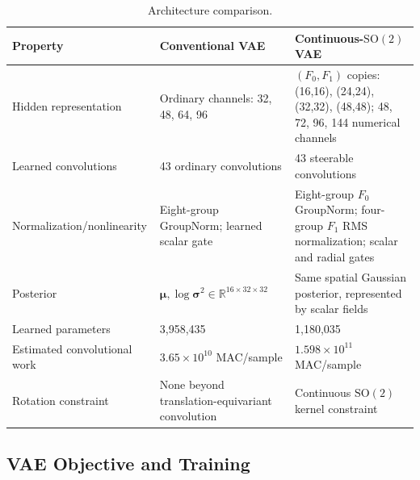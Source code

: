 \documentclass[conference,a4paper]{IEEEtran}
\newcommand{\SOtwo}{\mathrm{SO}(2)}
\begin{document}
\begin{table}[t]
\caption{Architecture comparison.}
\label{tab:architectures}
\centering
\footnotesize
\begin{tabular}{p{}p{}p{}}
\toprule
Property & Conventional VAE & Continuous-$\SOtwo$ VAE \\
\midrule
Hidden representation & Ordinary channels: 32, 48, 64, 96 & $(F_0,F_1)$ copies: (16,16), (24,24), (32,32), (48,48); 48, 72, 96, 144 numerical channels \\
Learned convolutions & 43 ordinary convolutions & 43 steerable convolutions \\
Normalization/nonlinearity & Eight-group GroupNorm; learned scalar gate & Eight-group $F_0$ GroupNorm; four-group $F_1$ RMS normalization; scalar and radial gates \\
Posterior & $\boldsymbol{\mu},\log\boldsymbol{\sigma}^{2}\in\mathbb{R}^{16\times32\times32}$ & Same spatial Gaussian posterior, represented by scalar fields \\
Learned parameters & 3,958,435 & 1,180,035 \\
Estimated convolutional work & $3.65\times10^{10}$ MAC/sample & $1.598\times10^{11}$ MAC/sample \\
Rotation constraint & None beyond translation-equivariant convolution & Continuous $\SOtwo$ kernel constraint \\
\bottomrule
\end{tabular}
\end{table}

\subsection{VAE Objective and Training}
\end{document}
